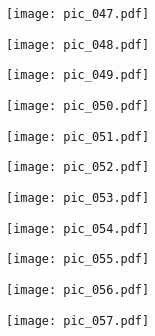 \documentclass[12pt,a4paper]{article}
\begin{document}
\newpage
\bigtitle
\begin{figure}[H]
\texttt{[image: pic\_047.pdf]}
\end{figure}

\newpage
\bigtitle
\begin{figure}[H]
\texttt{[image: pic\_048.pdf]}
\end{figure}

\newpage
\bigtitle
\begin{figure}[H]
\texttt{[image: pic\_049.pdf]}
\end{figure}

\newpage
\bigtitle
\begin{figure}[H]
\texttt{[image: pic\_050.pdf]}
\end{figure}

\newpage
\bigtitle
\begin{figure}[H]
\texttt{[image: pic\_051.pdf]}
\end{figure}

\newpage
\bigtitle
\begin{figure}[H]
\texttt{[image: pic\_052.pdf]}
\end{figure}

\newpage
\bigtitle
\begin{figure}[H]
\texttt{[image: pic\_053.pdf]}
\end{figure}

\newpage
\bigtitle
\begin{figure}[H]
\texttt{[image: pic\_054.pdf]}
\end{figure}

\newpage
\bigtitle
\begin{figure}[H]
\texttt{[image: pic\_055.pdf]}
\end{figure}

\newpage
\bigtitle
\begin{figure}[H]
\texttt{[image: pic\_056.pdf]}
\end{figure}

\newpage
\bigtitle
\begin{figure}[H]
\texttt{[image: pic\_057.pdf]}
\end{figure}
\end{document}
